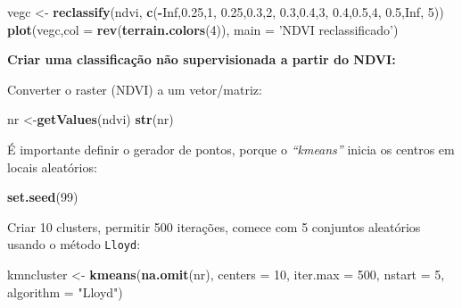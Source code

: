 \documentclass[
]{book}
\newenvironment{Shaded}{\begin{snugshade}}{\end{snugshade}}
\newcommand{\DataTypeTok}[1]{\textcolor[rgb]{0.13,0.29,0.53}{#1}}
\newcommand{\DecValTok}[1]{\textcolor[rgb]{0.00,0.00,0.81}{#1}}
\newcommand{\FloatTok}[1]{\textcolor[rgb]{0.00,0.00,0.81}{#1}}
\newcommand{\KeywordTok}[1]{\textcolor[rgb]{0.13,0.29,0.53}{\textbf{#1}}}
\newcommand{\NormalTok}[1]{#1}
\newcommand{\OperatorTok}[1]{\textcolor[rgb]{0.81,0.36,0.00}{\textbf{#1}}}
\newcommand{\OtherTok}[1]{\textcolor[rgb]{0.56,0.35,0.01}{#1}}
\newcommand{\StringTok}[1]{\textcolor[rgb]{0.31,0.60,0.02}{#1}}
\begin{document}
\begin{Shaded}
\begin{Highlighting}[]
\NormalTok{vegc <-}\StringTok{ }\KeywordTok{reclassify}\NormalTok{(ndvi, }\KeywordTok{c}\NormalTok{(}\OperatorTok{-}\OtherTok{Inf}\NormalTok{,}\FloatTok{0.25}\NormalTok{,}\DecValTok{1}\NormalTok{, }\FloatTok{0.25}\NormalTok{,}\FloatTok{0.3}\NormalTok{,}\DecValTok{2}\NormalTok{, }\FloatTok{0.3}\NormalTok{,}\FloatTok{0.4}\NormalTok{,}\DecValTok{3}\NormalTok{, }\FloatTok{0.4}\NormalTok{,}\FloatTok{0.5}\NormalTok{,}\DecValTok{4}\NormalTok{, }\FloatTok{0.5}\NormalTok{,}\OtherTok{Inf}\NormalTok{, }\DecValTok{5}\NormalTok{))}
\KeywordTok{plot}\NormalTok{(vegc,}\DataTypeTok{col =} \KeywordTok{rev}\NormalTok{(}\KeywordTok{terrain.colors}\NormalTok{(}\DecValTok{4}\NormalTok{)), }\DataTypeTok{main =} \StringTok{'NDVI reclassificado'}\NormalTok{)}
\end{Highlighting}
\end{Shaded}

\textbf{Criar uma classificação não supervisionada a partir do NDVI:}

Converter o raster (NDVI) a um vetor/matriz:

\begin{Shaded}
\begin{Highlighting}[]
\NormalTok{nr <-}\KeywordTok{getValues}\NormalTok{(ndvi)}
\KeywordTok{str}\NormalTok{(nr)}
\end{Highlighting}
\end{Shaded}

É importante definir o gerador de pontos, porque o \emph{``kmeans''} inicia os centros em locais aleatórios:

\begin{Shaded}
\begin{Highlighting}[]
\KeywordTok{set.seed}\NormalTok{(}\DecValTok{99}\NormalTok{)}
\end{Highlighting}
\end{Shaded}

Criar 10 clusters, permitir 500 iterações, comece com 5 conjuntos aleatórios usando o método \texttt{Lloyd}:

\begin{Shaded}
\begin{Highlighting}[]
\NormalTok{kmncluster <-}\StringTok{ }\KeywordTok{kmeans}\NormalTok{(}\KeywordTok{na.omit}\NormalTok{(nr), }\DataTypeTok{centers =} \DecValTok{10}\NormalTok{, }\DataTypeTok{iter.max =} \DecValTok{500}\NormalTok{,}
                     \DataTypeTok{nstart =} \DecValTok{5}\NormalTok{, }\DataTypeTok{algorithm =} \StringTok{"Lloyd"}\NormalTok{)}
\end{Highlighting}
\end{Shaded}
\end{document}
